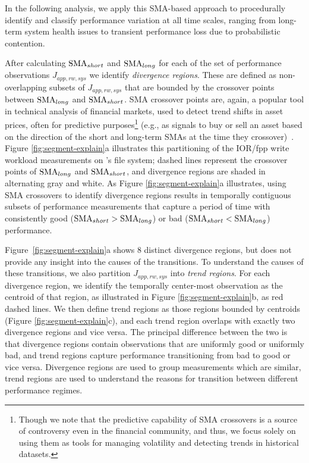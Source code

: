 In the following analysis, we apply this SMA-based approach to procedurally identify and classify performance variation at all time scales, ranging from long-term system health issues to transient performance loss due to probabilistic contention.



After calculating $\textup{SMA}_{short}$ and $\textup{SMA}_{long}$ for each of the set of performance observations $J_{app, rw, sys}$ we identify \emph{divergence regions}. These are defined as non-overlapping subsets of $J_{app, rw, sys}$ that are bounded by the crossover points between $\textup{SMA}_{long}$ and $\textup{SMA}_{short}$.
SMA crossover points are, again, a popular tool in technical analysis of financial markets, used to detect trend shifts in asset prices, often for predictive purposes\footnote{Though we note that the predictive capability of SMA crossovers is a source of controversy even in the financial community, and thus, we focus solely on using them as tools for managing volatility and detecting trends in historical datasets.} (e.g., as signals to buy or sell an asset based on the direction of the short and long-term SMAs at the time they crossover)~\cite{brock1992simple}.
Figure \ref{fig:segment-explain}a illustrates this partitioning of the IOR/fpp write workload measurements on \edison's \scratchtwo file system;
dashed lines represent the crossover points of $\textup{SMA}_{long}$ and $\textup{SMA}_{short}$, and divergence regions are shaded in alternating gray and white.
As Figure \ref{fig:segment-explain}a illustrates, using SMA crossovers to identify divergence regions results in temporally contiguous subsets of performance measurements that capture a period of time with consistently good (${\textup{SMA}_{short} > \textup{SMA}_{long}}$) or bad (${\textup{SMA}_{short} < \textup{SMA}_{long}}$) performance.

Figure~\ref{fig:segment-explain}a shows 8 distinct divergence regions, but does not provide any insight into the causes of the transitions. To understand the causes of these transitions, we also partition $J_{app, rw, sys}$ into \emph{trend regions}.
For each divergence region, we identify the temporally center-most observation as the centroid of that region, as illustrated in Figure \ref{fig:segment-explain}b, as red dashed lines.
We then define trend regions as those regions bounded by centroids (Figure \ref{fig:segment-explain}c), and each trend region overlaps with exactly two divergence regions and vice versa.
The principal difference between the two is that divergence regions contain observations that are uniformly good or uniformly bad, and trend regions capture performance transitioning from bad to good or vice versa. Divergence regions are used to group measurements which are similar, trend regions are used to understand the reasons for transition between different performance regimes.



